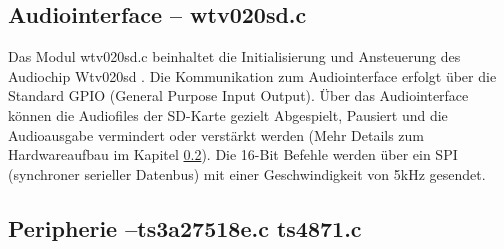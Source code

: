 \subsection{Audiointerface -- wtv020sd.c}
Das Modul wtv020sd.c beinhaltet die Initialisierung und Ansteuerung des Audiochip Wtv020sd \cite{WTV020}. Die Kommunikation zum Audiointerface erfolgt über die Standard GPIO (General Purpose Input Output). Über das Audiointerface können die Audiofiles der SD-Karte gezielt Abgespielt, Pausiert und die Audioausgabe vermindert oder verstärkt werden (Mehr Details zum Hardwareaufbau im Kapitel \ref{}). Die 16-Bit Befehle werden über ein SPI (synchroner serieller Datenbus) mit einer Geschwindigkeit von 5kHz gesendet.


\subsection{Peripherie --ts3a27518e.c ts4871.c }

